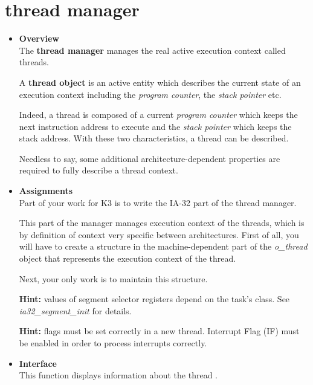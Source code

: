 \section{\textbf{thread} manager}
\begin{itemize}
  \item {\bf Overview}\\

    The \textbf{thread manager} manages the real active execution
    context called threads.

    A \textbf{thread object} is an active entity which describes the
    current state of an execution context including the
    \textit{program counter}, the \textit{stack pointer} etc.

    Indeed, a thread is composed of a current \textit{program counter}
    which keeps the next instruction address to execute and the
    \textit{stack pointer} which keeps the stack address. With these
    two characteristics, a thread can be described.

    Needless to say, some additional architecture-dependent properties
    are required to fully describe a thread context.

  \item {\bf Assignments}\\

    Part of your work for K3 is to write the IA-32 part of the thread
    manager.

    This part of the manager manages execution context of the threads,
    which is by definition of context very specific between
    architectures. First of all, you will have to create a structure
    in the machine-dependent part of the \emph{o\_thread} object that
    represents the execution context of the thread.

    Next, your only work is to maintain this structure.

    \textbf{Hint:} values of segment selector registers depend on the
    task's class. See \emph{ia32\_segment\_init} for details.

    \textbf{Hint:} flags must be set correctly in a new
    thread. Interrupt Flag (IF) must be enabled in order to process
    interrupts correctly.

  \item {\bf Interface}\\

	 {
	   This function displays information about the thread .
	 }


\end{itemize}

